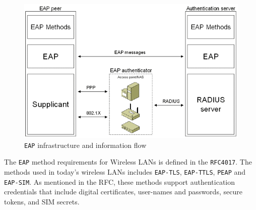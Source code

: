 \begin{figure}[H]
	\includegraphics[width=1\linewidth]{Pictures/Chapter2/eap.png}
	\caption{\texttt{EAP} infrastructure and information flow}
\end{figure}

The \texttt{EAP} method requirements for Wireless LANs is defined in the \texttt{RFC4017}\cite{rfc4017}. The methods used in today's wireless LANs includes \texttt{EAP-TLS}, \texttt{EAP-TTLS}, \texttt{PEAP} and \texttt{EAP-SIM}. As mentioned in the RFC, these methods support authentication credentials that include digital certificates, user-names and passwords, secure tokens, and SIM secrets.

